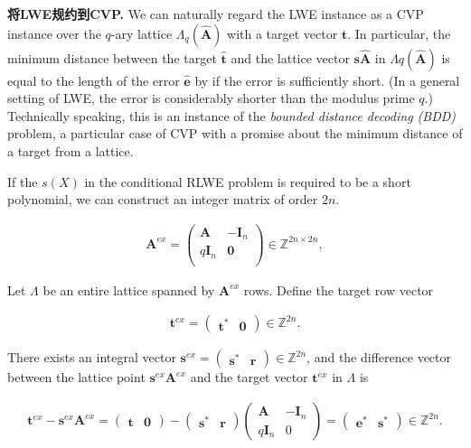 \documentclass[12pt,a4paper]{article}
\numberwithin{equation}{section}
\begin{document}
\textbf{将LWE规约到CVP.} 
We can naturally regard the LWE instance as a CVP instance over the $q$-ary lattice $\Lambda _q(\mathbf{\hat{A}})$ with a target vector $\mathbf{\hat{t}}$. In particular, the minimum distance between the target $\mathbf{\hat{t}}$ and the lattice vector $\mathbf{s}\mathbf{\hat{A}}$ in $\Lambda q(\mathbf{\hat{A}})$ is equal to the length of the error $\mathbf{\hat{e}}$ by if the error is sufficiently short. (In a general setting of LWE, the error is considerably shorter than the modulus prime $q$.) Technically speaking, this is an instance of the \emph{bounded distance decoding (BDD)} problem, a particular case of CVP with a promise about the minimum distance of a target from a lattice. 

If the $s (X)$ in the conditional RLWE problem is required to be a short polynomial, we can construct an integer matrix of order $2n$.

\begin{align}
    \mathbf{A}^{ex} = 
    \left(
    \begin{matrix}
        \mathbf{A}    &  -\mathbf{I}_n \\
        q\mathbf{I}_n &  \mathbf{0}    \\
    \end{matrix}
    \right) \in \mathbb{Z}^{2n \times 2n},
\end{align}

Let $\Lambda$ be an entire lattice spanned by $\mathbf{A}^{ex}$ rows. Define the target row vector 

\begin{align}
    \mathbf{t}^{ex} = \left( \begin{matrix}
        \mathbf{t}^* & \mathbf{0}
    \end{matrix} \right) \in \mathbb{Z}^{2n}.
\end{align}

There exists an integral vector $\mathbf{s}^{ex} = \left(\begin{matrix} \mathbf{s}^* & \mathbf{r} \end{matrix}\right) \in \mathbb{Z}^{2n}$, and the difference vector between the lattice point $\mathbf{s}^{ex}\mathbf{A}^{ex}$ and the target vector $\mathbf{t}^{ex}$ in $\Lambda$ is

\begin{align}
    \mathbf{t}^{ex} - \mathbf{s}^{ex}\mathbf{A}^{ex} = \left( \begin{matrix}
        \mathbf{t} & \mathbf{0}
    \end{matrix} \right) - \left( \begin{matrix}
        \mathbf{s}^* & \mathbf{r}
    \end{matrix} \right) 
    \left( 
    \begin{matrix}
        \mathbf{A} & -\mathbf{I}_n\\
        q\mathbf{I}_n & 0
    \end{matrix}
    \right) 
    =
    \left( \begin{matrix}
        \mathbf{e}^* & \mathbf{s}^*
    \end{matrix} \right)\in \mathbb{Z}^{2n}.
\end{align}
\end{document}
